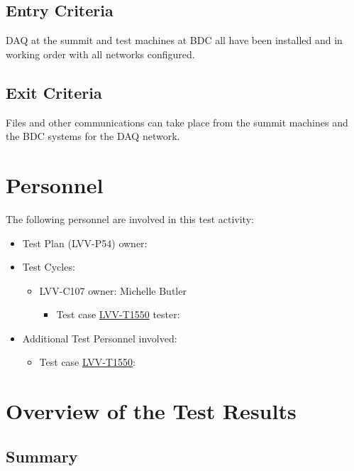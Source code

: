 \documentclass[DM,lsstdraft,STR,toc]{lsstdoc}
\begin{document}
  \subsection{Entry Criteria}
  DAQ at the summit and test machines at BDC all have been installed and
in working order with all networks configured.~~


  \subsection{Exit Criteria}
  Files and other communications can take place from the summit machines
and the BDC systems for the DAQ network.~~



\newpage
\section{Personnel}
\label{sect:personnel}

The following personnel are involved in this test activity:

\begin{itemize}
\item Test Plan (LVV-P54) owner: 
\item Test Cycles:
\begin{itemize}
  \item LVV-C107 owner: 
    Michelle Butler
  \begin{itemize}
    \item Test case \href{https://jira.lsstcorp.org/secure/Tests.jspa#/testCase/LVV-T1550}{LVV-T1550} tester: 
  \end{itemize}
\end{itemize}
\item Additional Test Personnel involved:
  \begin{itemize}
    \item Test case \href{https://jira.lsstcorp.org/secure/Tests.jspa#/testCase/LVV-T1550}{LVV-T1550}: 
  \end{itemize}
\end{itemize}

\newpage

\section{Overview of the Test Results}
\label{sect:overview}

\subsection{Summary}
\label{sect:summarytable}
\end{document}
